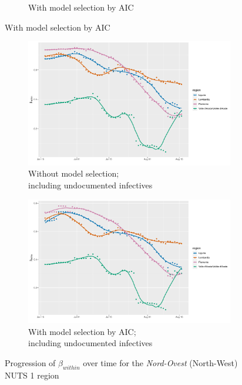 \documentclass[12pt]{article}
\begin{document}
\begin{appendices}
\begin{figure}[H]
\begin{subfigure}{\textwidth}
    	      \caption{With model selection by AIC}
    	      \label{fig:beta_within_over_time_northwest_aic}
    	    \end{subfigure}
        \end{figure}
        \begin{figure}[H]\ContinuedFloat
    	    \begin{subfigure}{\textwidth}
    	      \centering
    	      \includegraphics[width=0.95\linewidth]{output/model_within_lag14_betawithin_Nord-Ovest_UndocQuadratic_rolling.pdf}
    	      \caption{Without model selection; \\ including undocumented infectives}
    	      \label{fig:beta_within_over_time_northwest_regular_undoc}
    	    \end{subfigure}\newline
    	    \begin{subfigure}{\textwidth}
    	      \centering
    	      \includegraphics[width=0.95\linewidth]{output/model_within_lag14_betawithin_Nord-Ovest_aic_UndocQuadratic_rolling.pdf}
    	      \caption{With model selection by AIC; \\ including undocumented infectives}
    	      \label{fig:beta_within_over_time_northwest_aic_undoc}
    	    \end{subfigure}
    	    \caption{Progression of $\beta_{within}$ over time for the \textit{Nord-Ovest} (North-West) NUTS 1 region}
    	    \label{fig:beta_within_over_time_northwest}
    	\end{figure}
		

\end{appendices}
\end{document}
